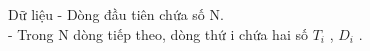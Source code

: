 Dữ liệu  
- Dòng đầu tiên chứa số N.   
\\   - Trong N dòng tiếp theo, dòng thứ i chứa hai số $T_{i}$   , $D_{i}$   .
